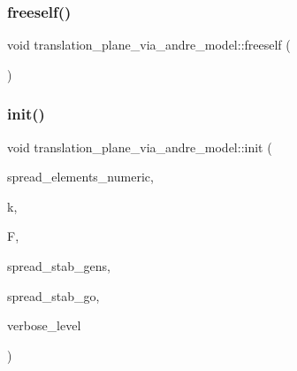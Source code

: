 \subsubsection{\texorpdfstring{freeself()}{freeself()}}
{\footnotesize\ttfamily void translation\+\_\+plane\+\_\+via\+\_\+andre\+\_\+model\+::freeself (\begin{DoxyParamCaption}{ }\end{DoxyParamCaption})}

\mbox{\label{classtranslation__plane__via__andre__model_adb424599de168ade331979a9218ee07b}} 
\subsubsection{\texorpdfstring{init()}{init()}}
{\footnotesize\ttfamily void translation\+\_\+plane\+\_\+via\+\_\+andre\+\_\+model\+::init (\begin{DoxyParamCaption}\item[{\mbox{\hyperlink{galois_8h_a09fddde158a3a20bd2dcadb609de11dc}{I\+NT}} $\ast$}]{spread\+\_\+elements\+\_\+numeric,  }\item[{\mbox{\hyperlink{galois_8h_a09fddde158a3a20bd2dcadb609de11dc}{I\+NT}}}]{k,  }\item[{\mbox{\hyperlink{classfinite__field}{finite\+\_\+field}} $\ast$}]{F,  }\item[{\mbox{\hyperlink{classvector__ge}{vector\+\_\+ge}} $\ast$}]{spread\+\_\+stab\+\_\+gens,  }\item[{\mbox{\hyperlink{classlonginteger__object}{longinteger\+\_\+object}} \&}]{spread\+\_\+stab\+\_\+go,  }\item[{\mbox{\hyperlink{galois_8h_a09fddde158a3a20bd2dcadb609de11dc}{I\+NT}}}]{verbose\+\_\+level }\end{DoxyParamCaption})}

\mbox{\label{classtranslation__plane__via__andre__model_a92c9f5b286e62163e17e6baeeb5d3e18}} 

